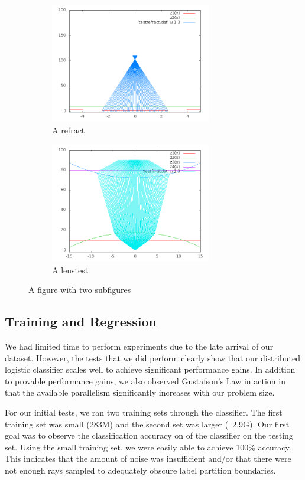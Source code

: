 \begin{figure}
\centering
\begin{subfigure}{.5\textwidth}
  \centering
  \includegraphics[width=7cm]{out4.png}
  \caption{A refract}
  \label{fig:sub3}
\end{subfigure}%
\begin{subfigure}{.5\textwidth}
  \centering
  \includegraphics[width=7cm]{out5.png}
  \caption{A lenstest}
  \label{fig:sub4}
\end{subfigure}
\caption{A figure with two subfigures}
\label{fig:test2}
\end{figure}



\subsection{Training and Regression}

We had limited time to perform experiments due to the late arrival of our dataset.  However, the tests that we did perform clearly show that our distributed logistic classifier scales well to achieve significant performance gains.  In addition to provable performance gains, we also observed Gustafson's Law in action in that the available parallelism significantly increases with our problem size.

For our initial tests, we ran two training sets through the classifier.  The first training set was small (283M) and the second set was larger (~2.9G).  Our first goal was to observe the classification accuracy on of the classifier on the testing set.  Using the small training set, we were easily able to achieve 100\% accuracy.  This indicates that the amount of noise was insufficient and/or that there were not enough rays sampled to adequately obscure label partition boundaries.

